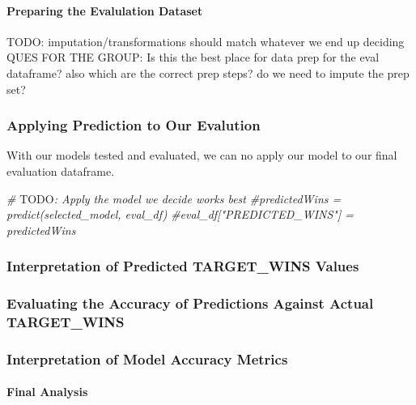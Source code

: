 \documentclass[
]{article}
\newenvironment{Shaded}{\begin{snugshade}}{\end{snugshade}}
\newcommand{\AlertTok}[1]{\textcolor[rgb]{0.94,0.16,0.16}{#1}}
\newcommand{\CommentTok}[1]{\textcolor[rgb]{0.56,0.35,0.01}{\textit{#1}}}
\begin{document}
\paragraph{Preparing the Evalulation
Dataset}\label{preparing-the-evalulation-dataset}

TODO: imputation/transformations should match whatever we end up
deciding QUES FOR THE GROUP: Is this the best place for data prep for
the eval dataframe? also which are the correct prep steps? do we need to
impute the prep set?

\subsubsection{Applying Prediction to Our
Evalution}\label{applying-prediction-to-our-evalution}

With our models tested and evaluated, we can no apply our model to our
final evaluation dataframe.

\begin{Shaded}
\begin{Highlighting}[]
\CommentTok{\# }\AlertTok{TODO}\CommentTok{: Apply the model we decide works best}
\CommentTok{\#predictedWins = predict(selected\_model, eval\_df)}
\CommentTok{\#eval\_df["PREDICTED\_WINS"] = predictedWins}
\end{Highlighting}
\end{Shaded}

\subsubsection{Interpretation of Predicted TARGET\_WINS
Values}\label{interpretation-of-predicted-target_wins-values}

\subsubsection{Evaluating the Accuracy of Predictions Against Actual
TARGET\_WINS}\label{evaluating-the-accuracy-of-predictions-against-actual-target_wins}

\subsubsection{Interpretation of Model Accuracy
Metrics}\label{interpretation-of-model-accuracy-metrics}

\paragraph{Final Analysis}\label{final-analysis}
\end{document}
